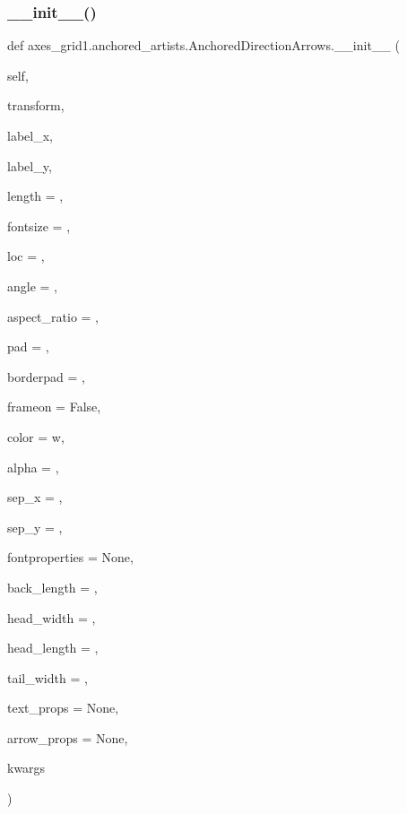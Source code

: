 \subsubsection{\texorpdfstring{\+\_\+\+\_\+init\+\_\+\+\_\+()}{\_\_init\_\_()}}
{\footnotesize\ttfamily def axes\+\_\+grid1.\+anchored\+\_\+artists.\+Anchored\+Direction\+Arrows.\+\_\+\+\_\+init\+\_\+\+\_\+ (\begin{DoxyParamCaption}\item[{}]{self,  }\item[{}]{transform,  }\item[{}]{label\+\_\+x,  }\item[{}]{label\+\_\+y,  }\item[{}]{length = {},  }\item[{}]{fontsize = {},  }\item[{}]{loc = {},  }\item[{}]{angle = {},  }\item[{}]{aspect\+\_\+ratio = {},  }\item[{}]{pad = {},  }\item[{}]{borderpad = {},  }\item[{}]{frameon = {\ttfamily False},  }\item[{}]{color = {\ttfamily \textquotesingle{}w\textquotesingle{}},  }\item[{}]{alpha = {},  }\item[{}]{sep\+\_\+x = {},  }\item[{}]{sep\+\_\+y = {},  }\item[{}]{fontproperties = {\ttfamily None},  }\item[{}]{back\+\_\+length = {},  }\item[{}]{head\+\_\+width = {},  }\item[{}]{head\+\_\+length = {},  }\item[{}]{tail\+\_\+width = {},  }\item[{}]{text\+\_\+props = {\ttfamily None},  }\item[{}]{arrow\+\_\+props = {\ttfamily None},  }\item[{}]{kwargs }\end{DoxyParamCaption})}


